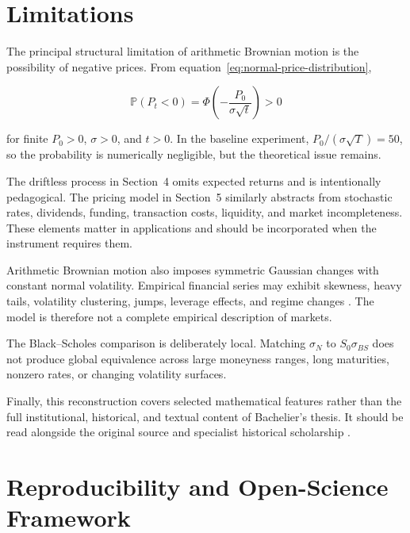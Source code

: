 \documentclass[11pt,a4paper]{article}
\newcommand{\Prob}{\mathbb{P}}
\begin{document}
\section{Limitations}

The principal structural limitation of arithmetic Brownian motion is the possibility of negative prices. From equation~\eqref{eq:normal-price-distribution},

\begin{equation}
\Prob(P_t<0)=\Phi\!\left(-\frac{P_0}{\sigma\sqrt{t}}\right)>0
\end{equation}

for finite \(P_0>0\), \(\sigma>0\), and \(t>0\). In the baseline experiment, \(P_0/(\sigma\sqrt{T})=50\), so the probability is numerically negligible, but the theoretical issue remains.

The driftless process in Section~4 omits expected returns and is intentionally pedagogical. The pricing model in Section~5 similarly abstracts from stochastic rates, dividends, funding, transaction costs, liquidity, and market incompleteness. These elements matter in applications and should be incorporated when the instrument requires them.

Arithmetic Brownian motion also imposes symmetric Gaussian changes with constant normal volatility. Empirical financial series may exhibit skewness, heavy tails, volatility clustering, jumps, leverage effects, and regime changes \citep{mandelbrot1963,merton1976}. The model is therefore not a complete empirical description of markets.

The Black--Scholes comparison is deliberately local. Matching \(\sigma_N\) to \(S_0\sigma_{BS}\) does not produce global equivalence across large moneyness ranges, long maturities, nonzero rates, or changing volatility surfaces.

Finally, this reconstruction covers selected mathematical features rather than the full institutional, historical, and textual content of Bachelier's thesis. It should be read alongside the original source and specialist historical scholarship \citep{courtault2000,davisetheridge2006}.

\section{Reproducibility and Open-Science Framework}
\end{document}
